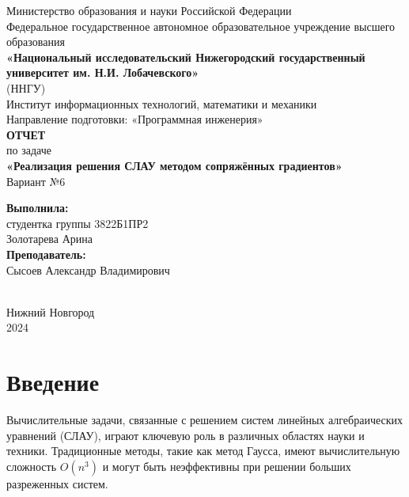 \documentclass[12pt]{article}
\begin{document}
\begin{titlepage}
    \centering
    \large
    Министерство образования и науки Российской Федерации\\
    Федеральное государственное автономное образовательное учреждение высшего образования\\
    \textbf{«Национальный исследовательский Нижегородский государственный университет им. Н.И. Лобачевского»}\\
    (ННГУ)\\[1cm]
    Институт информационных технологий, математики и механики\\
    Направление подготовки: «Программная инженерия»\\[2cm]
    
    {\Large \textbf{ОТЧЕТ}}\\[0.5cm]
    {\Large по задаче}\\[0.5cm]
    {\Large \textbf{«Реализация решения СЛАУ методом сопряжённых градиентов»}}\\[0.5cm]
    {\Large Вариант №6}\\[4cm]
    
    \hfill\parbox{0.5\textwidth}{
        \textbf{Выполнила:}\\
        студентка группы 3822Б1ПР2\\
        Золотарева Арина\\
        
        \textbf{Преподаватель:}\\
        Сысоев Александр Владимирович \\
    }\\[3cm]
    
    Нижний Новгород\\
    2024
\end{titlepage}

\thispagestyle{empty}
\clearpage
{} 
\setcounter{page}{2} 
\tableofcontents
\clearpage
\setcounter{page}{3} 
\section{Введение}

\hspace*{1.25em}Вычислительные задачи, связанные с решением систем линейных алгебраических уравнений (СЛАУ), играют ключевую роль в различных областях науки и техники. Традиционные методы, такие как метод Гаусса, имеют вычислительную сложность $O(n^3)$ и могут быть неэффективны при решении больших разреженных систем. 
\end{document}
